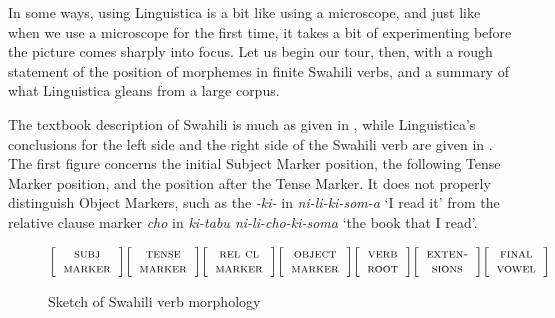 \documentclass[output=paper,colorlinks,citecolor=brown]{langscibook}
\begin{document}
In some ways, using Linguistica is a bit like using a microscope, and just like when we use a microscope for the first time, it takes a bit of experimenting before the picture comes sharply into focus. Let us begin our tour, then, with a rough statement of the position of morphemes in finite Swahili verbs, and a summary of what Linguistica gleans from a large corpus. 

The textbook description of Swahili is much as given in , while Linguistica's conclusions for the left side and the right side of the Swahili verb are given in . The first figure concerns the initial Subject Marker position, the following Tense Marker position, and the position after the Tense Marker. It does not properly distinguish Object Markers, such as the \textit{-ki-} in \textit{ni-li-ki-som-a} `I read it'  from the relative clause marker  \textit{cho} in \textit{ki-tabu ni-li-cho-ki-soma} `the book that I read'.     

  
\begin{figure}\footnotesize
 
$\bigg[
\begin{tabular}{c} 
\textsc{subj}\\
\textsc{marker}\\
\end{tabular}
\bigg] 
\bigg[
\begin{tabular}{c} 
\textsc{tense}\\
\textsc{marker}\\
\end{tabular}
\bigg] 
\bigg[
\begin{tabular}{c} 
\textsc{rel cl}\\
\textsc{marker}\\
\end{tabular}
\bigg] 
\bigg[
\begin{tabular}{c} 
\textsc{object}\\
\textsc{marker}\\
\end{tabular}
\bigg] 
\bigg[
\begin{tabular}{c}
\textsc{verb}\\ 
\textsc{root}\\
\end{tabular}
\bigg] 
\bigg[
\begin{tabular}{c} 
\textsc{exten-}\\
\textsc{sions}
\end{tabular}
\bigg] 
\bigg[
\begin{tabular}{c} 
\textsc{final}\\
\textsc{vowel}
\end{tabular}
\bigg] 
$
\caption{Sketch of Swahili verb morphology}
\label{sketch}
\end{figure}
\end{document}

